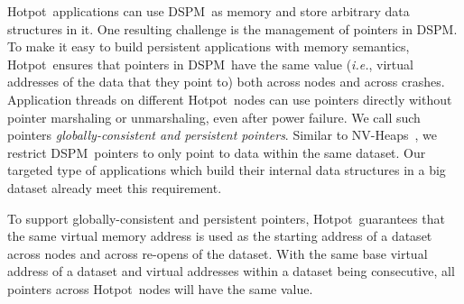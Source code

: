 \documentclass[sigconf]{acmart}
\renewcommand{\em}{\it}
\newcommand{\ie}{\textit{i.e.}}
\newcommand{\dsnvm}{DSPM}
\newcommand{\hotpot}{Hotpot}
\begin{document}
{\hotpot\ applications can use \dsnvm\ as memory and store arbitrary data structures in it. 
One resulting challenge is the management of pointers in \dsnvm.
To make it easy to build persistent applications with memory semantics, 
\hotpot\ ensures that pointers in \dsnvm\ have the same value (\ie, virtual addresses of the data that they point to) 
both across nodes and across crashes. 
Application threads on different \hotpot\ nodes can use pointers directly without pointer marshaling or unmarshaling,
even after power failure.
We call such pointers {\em globally-consistent and persistent pointers}.
Similar to NV-Heaps~\cite{Coburn11-ASPLOS}, we restrict \dsnvm\ pointers to only point to data within the same dataset. 
Our targeted type of applications which build their internal data structures in a big dataset already meet this requirement.

To support globally-consistent and persistent pointers, 
\hotpot\ guarantees that the same virtual memory address is used as the starting address of a dataset across nodes and across re-opens of the dataset.
With the same base virtual address of a dataset and virtual addresses within a dataset being consecutive, 
all pointers across \hotpot\ nodes will have the same value. 

}
\end{document}
